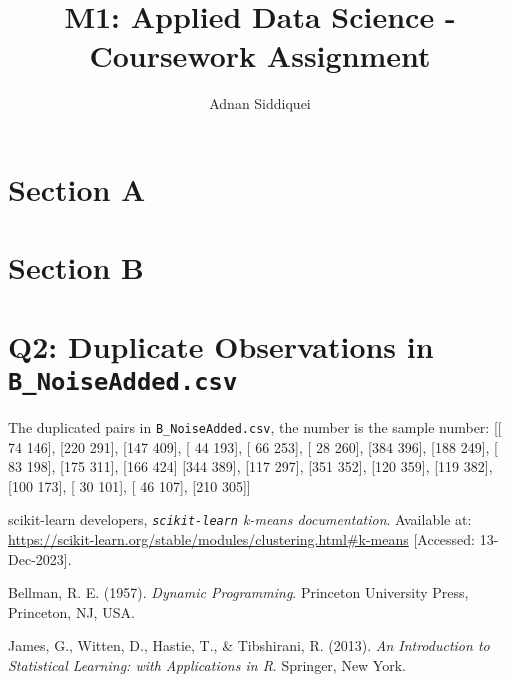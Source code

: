 \documentclass[a4paper,11pt]{article}
\title{\boldmath M1: Applied Data Science - Coursework Assignment}
\author{Adnan Siddiquei}
\affiliation{University of Cambridge}
\newcommand{\inlinecode}[1]{\lstinline{#1}}
\begin{document}
\maketitle
\flushbottom


\section{Section A}\label{sec:section-a}





\section{Section B}\label{sec:section-b}



\appendix

\section{Q2: Duplicate Observations in \inlinecode{B_NoiseAdded.csv}}\label{appendix:q2}
The duplicated pairs in \inlinecode{B_NoiseAdded.csv}, the number is the sample number:
[[ 74 146], [220 291], [147 409], [ 44 193], [ 66 253], [ 28 260], [384 396], [188 249], [ 83 198], [175 311], [166 424]
 [344 389], [117 297], [351 352], [120 359], [119 382], [100 173], [ 30 101], [ 46 107], [210 305]]


\begin{thebibliography}{99}

scikit-learn developers,
\textit{\inlinecode{scikit-learn} k-means documentation}.
Available at: \url{https://scikit-learn.org/stable/modules/clustering.html#k-means}
[Accessed: 13-Dec-2023].

Bellman, R. E. (1957).
\textit{Dynamic Programming}.
Princeton University Press, Princeton, NJ, USA.

James, G., Witten, D., Hastie, T., \& Tibshirani, R. (2013).
\textit{An Introduction to Statistical Learning: with Applications in R}.
Springer, New York.


\end{thebibliography}
\end{document}

